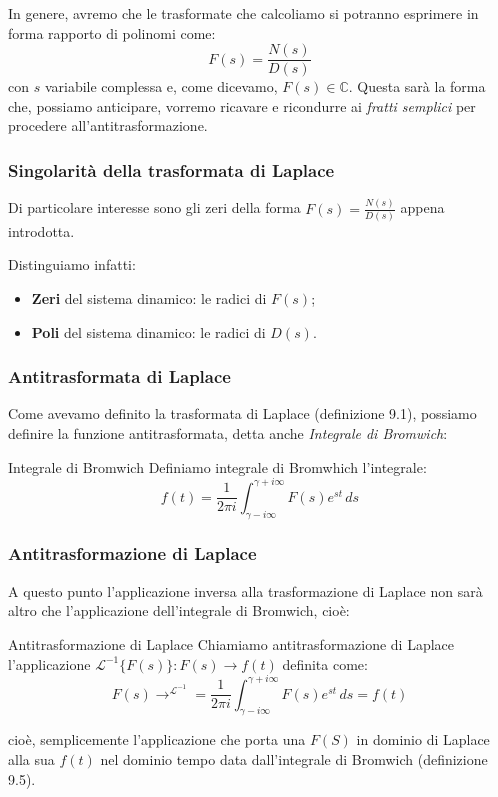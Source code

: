 \documentclass[a4paper,11pt]{article}
\begin{document}
In genere, avremo che le trasformate che calcoliamo si potranno esprimere in forma rapporto di polinomi come:
$$
F(s) = \frac{N(s)}{D(s)}
$$
con $s$ variabile complessa e, come dicevamo, $F(s) \in \mathbb{C}$.
Questa sarà la forma che, possiamo anticipare, vorremo ricavare e ricondurre ai \textit{fratti semplici} per procedere all'antitrasformazione.

\subsubsection{Singolarità della trasformata di Laplace}
Di particolare interesse sono gli zeri della forma 
$
F(s) = \frac{N(s)}{D(s)}
$
appena introdotta.

Distinguiamo infatti:
\begin{itemize}
	\item \textbf{Zeri} del sistema dinamico: le radici di $F(s)$;
	\item \textbf{Poli} del sistema dinamico: le radici di $D(s)$.
\end{itemize}

\subsubsection{Antitrasformata di Laplace}
Come avevamo definito la trasformata di Laplace (definizione 9.1), possiamo definire la funzione antitrasformata, detta anche \textit{Integrale di Bromwich}:
\begin{definition}{Integrale di Bromwich}
	Definiamo integrale di Bromwhich l'integrale:
	$$
	f(t) = \frac{1}{2 \pi i} \int_{\gamma - i \infty}^{\gamma + i \infty} F(s) e^{st} \, ds
	$$
\end{definition}

\subsubsection{Antitrasformazione di Laplace}
A questo punto l'applicazione inversa alla trasformazione di Laplace non sarà altro che l'applicazione dell'integrale di Bromwich, cioè:
\begin{definition}{Antitrasformazione di Laplace}
	Chiamiamo antitrasformazione di Laplace l'applicazione $\mathcal{L}^{-1}\{F(s)\} : F(s) \rightarrow f(t)$ definita come:
	$$
	F(s) \rightarrow^{\mathcal{L}^{-1}} = 	
	\frac{1}{2 \pi i} \int_{\gamma - i \infty}^{\gamma + i \infty} F(s) e^{st} \, ds = f(t)
	$$
\end{definition}
cioè, semplicemente l'applicazione che porta una $F(S)$ in dominio di Laplace alla sua $f(t)$ nel dominio tempo data dall'integrale di Bromwich (definizione 9.5).
\end{document}
